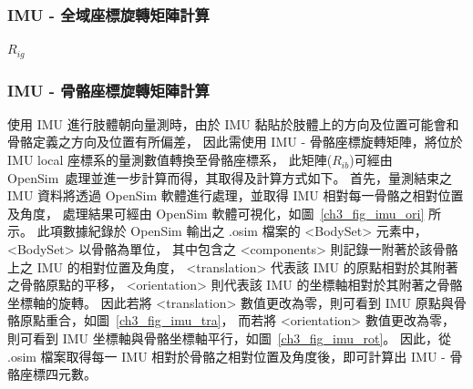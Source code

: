 \subsubsection{IMU - 全域座標旋轉矩陣計算}
$R_{ig}$

\subsubsection{IMU - 骨骼座標旋轉矩陣計算}
使用 IMU 進行肢體朝向量測時，由於 IMU 黏貼於肢體上的方向及位置可能會和骨骼定義之方向及位置有所偏差，
因此需使用 IMU - 骨骼座標旋轉矩陣，將位於 IMU local 座標系的量測數值轉換至骨骼座標系，
此矩陣($R_{ib}$)可經由 OpenSim~\cite{delp2007OpenSim}處理並進一步計算而得，其取得及計算方式如下。
首先，量測結束之 IMU 資料將透過 OpenSim 軟體進行處理，並取得 IMU 相對每一骨骼之相對位置及角度，
處理結果可經由 OpenSim 軟體可視化，如圖~\ref{ch3_fig_imu_ori} 所示。
此項數據紀錄於 OpenSim 輸出之 .osim 檔案的 <BodySet> 元素中，<BodySet> 以骨骼為單位，
其中包含之 <components> 則記錄一附著於該骨骼上之 IMU 的相對位置及角度，
<translation> 代表該 IMU 的原點相對於其附著之骨骼原點的平移，
<orientation> 則代表該 IMU 的坐標軸相對於其附著之骨骼坐標軸的旋轉。
因此若將 <translation> 數值更改為零，則可看到 IMU 原點與骨骼原點重合，如圖~\ref{ch3_fig_imu_tra}，
而若將 <orientation> 數值更改為零，則可看到 IMU 坐標軸與骨骼坐標軸平行，如圖~\ref{ch3_fig_imu_rot}。
因此，從 .osim 檔案取得每一 IMU 相對於骨骼之相對位置及角度後，即可計算出 IMU - 骨骼座標四元數。
